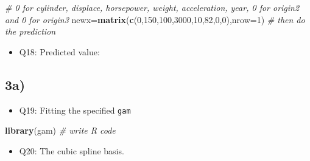 \documentclass[]{article}
\newenvironment{Shaded}{\begin{snugshade}}{\end{snugshade}}
\newcommand{\KeywordTok}[1]{\textcolor[rgb]{0.13,0.29,0.53}{\textbf{#1}}}
\newcommand{\DataTypeTok}[1]{\textcolor[rgb]{0.13,0.29,0.53}{#1}}
\newcommand{\DecValTok}[1]{\textcolor[rgb]{0.00,0.00,0.81}{#1}}
\newcommand{\CommentTok}[1]{\textcolor[rgb]{0.56,0.35,0.01}{\textit{#1}}}
\newcommand{\NormalTok}[1]{#1}
\providecommand{\tightlist}{%
  \setlength{\itemsep}{0pt}\setlength{\parskip}{0pt}}
\begin{document}
\begin{Shaded}
\begin{Highlighting}[]
\CommentTok{# 0 for cylinder, displace, horsepower, weight, acceleration, year, 0 for origin2 and 0 for origin3}
\NormalTok{newx=}\KeywordTok{matrix}\NormalTok{(}\KeywordTok{c}\NormalTok{(}\DecValTok{0}\NormalTok{,}\DecValTok{150}\NormalTok{,}\DecValTok{100}\NormalTok{,}\DecValTok{3000}\NormalTok{,}\DecValTok{10}\NormalTok{,}\DecValTok{82}\NormalTok{,}\DecValTok{0}\NormalTok{,}\DecValTok{0}\NormalTok{),}\DataTypeTok{nrow=}\DecValTok{1}\NormalTok{)}
\CommentTok{# then do the prediction}
\end{Highlighting}
\end{Shaded}

\begin{itemize}
\tightlist
\item
  Q18: Predicted value:
\end{itemize}

\subsection{3a)}\label{a-1}

\begin{itemize}
\tightlist
\item
  Q19: Fitting the specified \texttt{gam}
\end{itemize}

\begin{Shaded}
\begin{Highlighting}[]
\KeywordTok{library}\NormalTok{(gam)}
\CommentTok{# write R code}
\end{Highlighting}
\end{Shaded}

\begin{itemize}
\tightlist
\item
  Q20: The cubic spline basis.
\end{itemize}
\end{document}
